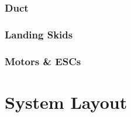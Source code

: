\subsubsection{Duct}
\subsubsection{Landing Skids}
\subsubsection{Motors \& ESCs}

\section{System Layout}
\label{sec:ch2.layout}
